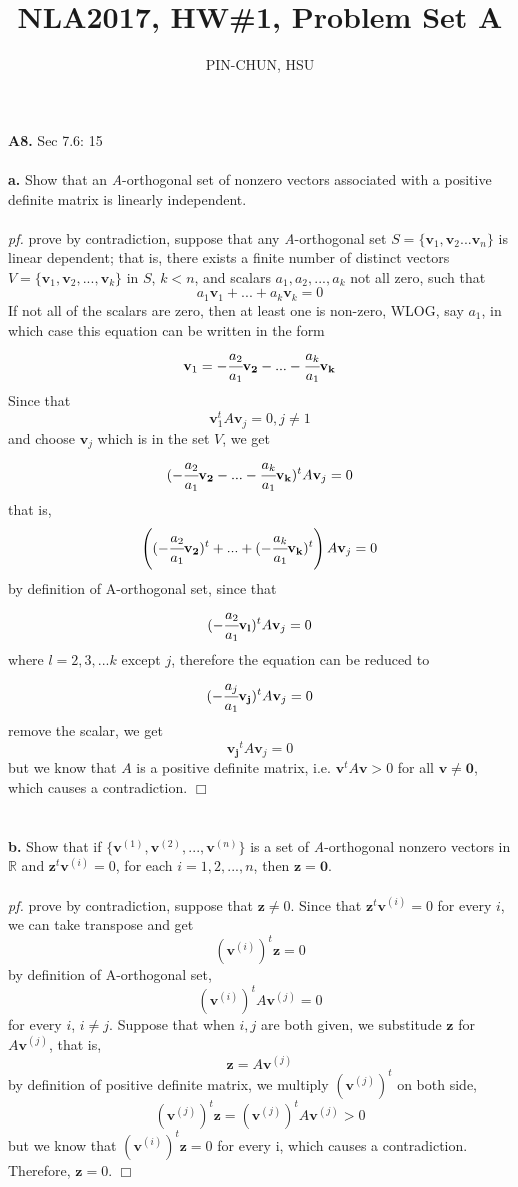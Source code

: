 \documentclass[12pt, a4paper]{article}
\title{NLA2017, HW\#1, Problem Set A}
\author{PIN-CHUN, HSU}
\begin{document}
\maketitle{}

{\large \textbf{A8.} Sec 7.6: 15} \\
\\
\textbf{a.} Show that an \textit{A}-orthogonal set of nonzero vectors associated with a positive definite matrix is linearly independent.
\\
\\
\textit{pf.} prove by contradiction, suppose that any \textit{A}-orthogonal set $S = \{\mathbf{v}_1, \mathbf{v}_2...\mathbf{v}_n\}$ is linear dependent; that is, there exists a finite number of distinct vectors $V = \{\mathbf{v}_1, \mathbf{v}_2, ..., \mathbf{v}_k\}$ in $S$, $k < n$, and scalars $a_1, a_2, ..., a_k$ not all zero, such that $$ a_1 \mathbf{v}_1 + ... + a_k \mathbf{v}_k = 0$$ 
If not all of the scalars are zero, then at least one is non-zero, WLOG, say $a_{1}$, in which case this equation can be written in the form $$\mathbf{v}_1 = -\cfrac{a_2}{a_1}\mathbf{v_2}-...-\cfrac{a_k}{a_1}\mathbf{v_k}$$
Since that $$\mathbf{v}_1^{t}A\mathbf{v}_j = 0, j \neq 1$$and choose $\mathbf{v}_j$ which is in the set $V$, we get $$(-\cfrac{a_2}{a_1}\mathbf{v_2}-...-\cfrac{a_k}{a_1}\mathbf{v_k})^{t}A\mathbf{v}_j = 0$$ that is, $$\left((-\cfrac{a_2}{a_1}\mathbf{v_2})^{t}+...+(-\cfrac{a_k}{a_1}\mathbf{v_k})^{t}\right)A\mathbf{v}_j = 0$$ 
by definition of A-orthogonal set, since that $$(-\cfrac{a_2}{a_1}\mathbf{v_l})^{t}A\mathbf{v}_j = 0$$ where $l = 2, 3, ...k$ except $j$, therefore the equation can be reduced to $$(-\cfrac{a_j}{a_1}\mathbf{v_j})^{t}A\mathbf{v}_j = 0$$ remove the scalar, we get $$\mathbf{v_j}^{t}A\mathbf{v}_j = 0$$ but we know that $A$ is a positive definite matrix, i.e. $\mathbf{v}^{t}A\mathbf{v} > 0$ for all $\mathbf{v} \neq \mathbf{0}$, which causes a contradiction. $\Box$
\\
\\
\\
\textbf{b.} Show that if $\{\mathbf{v}^{(1)}, \mathbf{v}^{(2)},... , \mathbf{v}^{(n)}\}$ is a set of \textit{A}-orthogonal nonzero vectors in $\mathbb{R}$ and $\mathbf{z}^{t}\mathbf{v}^{(i)} = 0$, for each $i = 1,2,... ,n$, then $\mathbf{z} = \mathbf{0}$.
\\
\\
\textit{pf.} prove by contradiction, suppose that $\mathbf{z} \neq 0$. Since that $\mathbf{z}^t\mathbf{v}^{(i)} = 0$ for every $i$, we can take transpose and get $$(\mathbf{v}^{(i)})^{t}\mathbf{z} = 0$$ by definition of A-orthogonal set, $$(\mathbf{v}^{(i)})^{t}A\mathbf{v}^{(j)} = 0$$ for every $i$, $i \neq j$. Suppose that when $i, j$ are both given, we substitude $\mathbf{z}$ for $A\mathbf{v}^{(j)}$, that is, $$\mathbf{z} = A\mathbf{v}^{(j)}$$ by definition of positive definite matrix, we multiply $(\mathbf{v}^{(j)})^{t}$ on both side, $$(\mathbf{v}^{(j)})^{t}\mathbf{z} = (\mathbf{v}^{(j)})^{t}A\mathbf{v}^{(j)} > 0$$ but we know that $(\mathbf{v}^{(i)})^{t}\mathbf{z} = 0$ for every i, which causes a contradiction. Therefore, $\mathbf{z} = 0$. $\Box$
\end{document}
